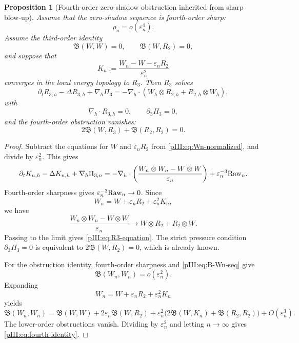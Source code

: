 \documentclass[11pt]{article}
\numberwithin{equation}{section}
\theoremstyle{plain}
\newtheorem{proposition}{Proposition}[section]
\theoremstyle{definition}
\theoremstyle{remark}
\newcommand{\eps}{\varepsilon}
\newcommand{\nabh}{\nabla_h}
\newcommand{\divh}{\nabla_h\!\cdot}
\newcommand{\calB}{\mathfrak B}
\begin{document}
\begin{proposition}[Fourth-order zero-shadow obstruction inherited from sharp blow-up]
\label{pIII:prop:fourth-order-zero-shadow}
Assume that the zero-shadow sequence is fourth-order sharp:
\[
        \rho_n=o(\eps_n^4).
\]
Assume the third-order identity
\[
        \calB(W,W)=0,
        \qquad
        \calB(W,R_2)=0,
\]
and suppose that
\begin{equation}\label{pIII:eq:Kn-def}
        K_n:=\frac{W_n-W-\eps_nR_2}{\eps_n^2}
\end{equation}
converges in the local energy topology to \(R_3\).  Then \(R_3\) solves
\begin{equation}\label{pIII:eq:R3-equation}
        \partial_tR_{3,h}-\Delta R_{3,h}+\nabh\Pi_3
        =
        -\nabh\cdot(W_h\otimes R_{2,h}+R_{2,h}\otimes W_h),
\end{equation}
with
\[
        \divh R_{3,h}=0,
        \qquad
        \partial_3\Pi_3=0,
\]
and the fourth-order obstruction vanishes:
\begin{equation}\label{pIII:eq:fourth-identity}
        2\calB(W,R_3)+\calB(R_2,R_2)=0.
\end{equation}
\end{proposition}

\begin{proof}
Subtract the equations for \(W\) and \(\eps_nR_2\) from \eqref{pIII:eq:Wn-normalized}, and divide
by \(\eps_n^2\).  This gives
\[
        \partial_tK_{n,h}-\Delta K_{n,h}+\nabh\Pi_{3,n}
        =
        -\nabh\cdot
        \left(
        \frac{W_n\otimes W_n-W\otimes W}{\eps_n}
        \right)
        +\eps_n^{-3}{\rm Raw}_n.
\]
Fourth-order sharpness gives \(\eps_n^{-3}{\rm Raw}_n\to0\).  Since
\[
        W_n=W+\eps_nR_2+\eps_n^2K_n,
\]
we have
\[
        \frac{W_n\otimes W_n-W\otimes W}{\eps_n}
        \to
        W\otimes R_2+R_2\otimes W.
\]
Passing to the limit gives \eqref{pIII:eq:R3-equation}.  The strict pressure condition
\(\partial_3\Pi_3=0\) is equivalent to \(2\calB(W,R_2)=0\), which is already known.

For the obstruction identity, fourth-order sharpness and \eqref{pIII:eq:B-Wn-seq} give
\[
        \calB(W_n,W_n)=o(\eps_n^2).
\]
Expanding
\[
        W_n=W+\eps_nR_2+\eps_n^2K_n
\]
yields
\[
        \calB(W_n,W_n)
        =
        \calB(W,W)
        +2\eps_n\calB(W,R_2)
        +\eps_n^2
        \bigl(2\calB(W,K_n)+\calB(R_2,R_2)\bigr)
        +O(\eps_n^3).
\]
The lower-order obstructions vanish.  Dividing by \(\eps_n^2\) and letting \(n\to\infty\)
gives \eqref{pIII:eq:fourth-identity}.
\end{proof}
\end{document}
